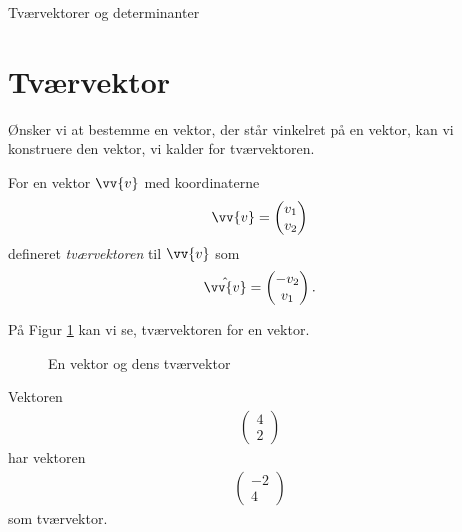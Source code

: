 \begin{center}
	\Huge
	Tværvektorer og determinanter
\end{center}

\section*{Tværvektor}

Ønsker vi at bestemme en vektor, der står vinkelret på en vektor, kan vi konstruere den vektor, vi kalder for tværvektoren.

\begin{defn}[Tværvektor]
	For en vektor $\vv{v}$ med koordinaterne
	\begin{align*}
		\vv{v} = 
		\begin{pmatrix}
			v_1 \\ v_2
		\end{pmatrix}
	\end{align*}
	defineret \textit{tværvektoren} til $\vv{v}$ som
	\begin{align*}
		\hat{\vv{v}} = 
		\begin{pmatrix}
			-v_2 \\ v_1
		\end{pmatrix}.
	\end{align*}
\end{defn}	

På Figur \ref{fig:tværvektor} kan vi se, tværvektoren for en vektor.

\begin{figure}[H]
	\centering
	\caption{En vektor og dens tværvektor}
	\label{fig:tværvektor}
\end{figure}

\begin{exa}
	Vektoren
	\begin{align*}
		\begin{pmatrix}
			4 \\ 2
		\end{pmatrix}
	\end{align*}
	har vektoren 
	\begin{align*}
		\begin{pmatrix}
			-2 \\ 4
		\end{pmatrix}
	\end{align*}
	som tværvektor. 
\end{exa}

